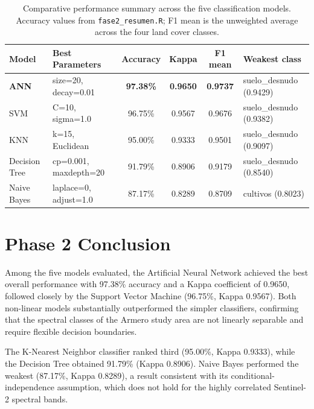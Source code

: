 \documentclass[12pt,a4paper]{article}
\begin{document}
\begin{table}[H]
\centering
\small
\begin{tabular}{|m{2.8cm}|m{3.8cm}|c|c|c|m{2.8cm}|}
\hline
\textbf{Model} & \textbf{Best Parameters} & \textbf{Accuracy} & \textbf{Kappa} & \textbf{F1 mean} & \textbf{Weakest class} \\
\hline
\textbf{ANN}  & size=20, decay=0.01   & \textbf{97.38\%} & \textbf{0.9650} & \textbf{0.9737} & suelo\_desnudo (0.9429) \\
\hline
SVM           & C=10, sigma=1.0       & 96.75\%          & 0.9567          & 0.9676          & suelo\_desnudo (0.9382) \\
\hline
KNN           & k=15, Euclidean       & 95.00\%          & 0.9333          & 0.9501          & suelo\_desnudo (0.9097) \\
\hline
Decision Tree & cp=0.001, maxdepth=20 & 91.79\%          & 0.8906          & 0.9179          & suelo\_desnudo (0.8540) \\
\hline
Naive Bayes   & laplace=0, adjust=1.0 & 87.17\%          & 0.8289          & 0.8709          & cultivos (0.8023)       \\
\hline
\end{tabular}
\caption{Comparative performance summary across the five classification models. Accuracy values from \texttt{fase2\_resumen.R}; F1 mean is the unweighted average across the four land cover classes.}
\end{table}

\section{Phase 2 Conclusion}

Among the five models evaluated, the Artificial Neural Network achieved the best overall performance with 97.38\% accuracy and a Kappa coefficient of 0.9650, followed closely by the Support Vector Machine (96.75\%, Kappa 0.9567). Both non-linear models substantially outperformed the simpler classifiers, confirming that the spectral classes of the Armero study area are not linearly separable and require flexible decision boundaries.

The K-Nearest Neighbor classifier ranked third (95.00\%, Kappa 0.9333), while the Decision Tree obtained 91.79\% (Kappa 0.8906). Naive Bayes performed the weakest (87.17\%, Kappa 0.8289), a result consistent with its conditional-independence assumption, which does not hold for the highly correlated Sentinel-2 spectral bands.
\end{document}
